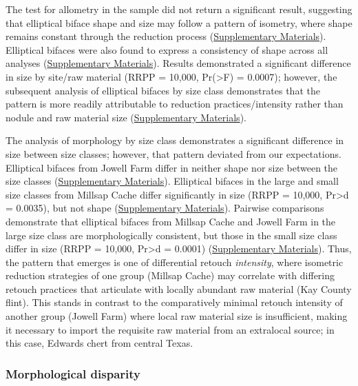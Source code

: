 \documentclass[]{interact}
\theoremstyle{plain}%
\theoremstyle{definition}
\theoremstyle{remark}
\begin{document}
The test for allometry in the sample did not return a significant
result, suggesting that elliptical biface shape and size may follow a
pattern of isometry, where shape remains constant through the reduction
process
(\href{https://seldenlab.github.io/elliptical.bifaces/}{Supplementary
Materials}). Elliptical bifaces were also found to express a consistency
of shape across all analyses
(\href{https://seldenlab.github.io/elliptical.bifaces/}{Supplementary
Materials}). Results demonstrated a significant difference in size by
site/raw material (RRPP = 10,000, Pr(\textgreater F) = 0.0007); however,
the subsequent analysis of elliptical bifaces by size class demonstrates
that the pattern is more readily attributable to reduction
practices/intensity rather than nodule and raw material size
(\href{https://seldenlab.github.io/elliptical.bifaces/}{Supplementary
Materials}).

The analysis of morphology by size class demonstrates a significant
difference in size between size classes; however, that pattern deviated
from our expectations. Elliptical bifaces from Jowell Farm differ in
neither shape nor size between the size classes
(\href{https://seldenlab.github.io/elliptical.bifaces/}{Supplementary
Materials}). Elliptical bifaces in the large and small size classes from
Millsap Cache differ significantly in size (RRPP = 10,000,
Pr\textgreater d = 0.0035), but not shape
(\href{https://seldenlab.github.io/elliptical.bifaces/}{Supplementary
Materials}). Pairwise comparisons demonstrate that elliptical bifaces
from Millsap Cache and Jowell Farm in the large size class are
morphologically consistent, but those in the small size class differ in
size (RRPP = 10,000, Pr\textgreater d = 0.0001)
(\href{https://seldenlab.github.io/elliptical.bifaces/}{Supplementary
Materials}). Thus, the pattern that emerges is one of differential
retouch \emph{intensity}, where isometric reduction strategies of one
group (Millsap Cache) may correlate with differing retouch practices
that articulate with locally abundant raw material (Kay County flint).
This stands in contrast to the comparatively minimal retouch intensity
of another group (Jowell Farm) where local raw material size is
insufficient, making it necessary to import the requisite raw material
from an extralocal source; in this case, Edwards chert from central
Texas.

\hypertarget{morphological-disparity}{%
\subsubsection{Morphological disparity}\label{morphological-disparity}}
\end{document}
